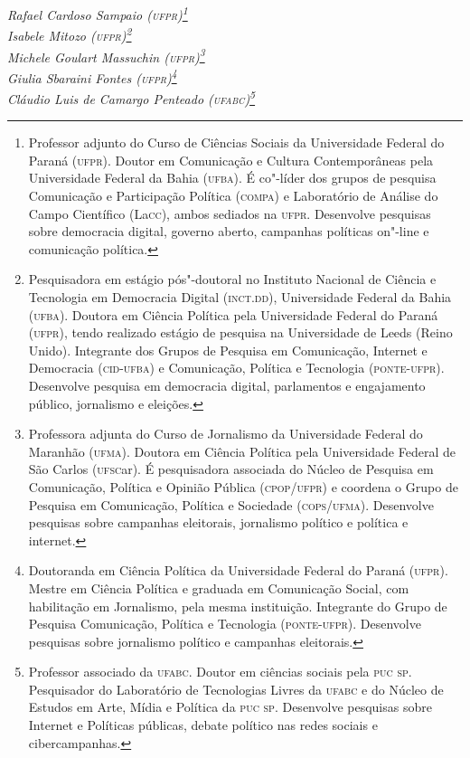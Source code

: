 \begin{flushright}
\emph{Rafael Cardoso Sampaio (\textsc{ufpr})\footnote{Professor adjunto do Curso de Ciências Sociais da Universidade Federal
do Paraná (\textsc{ufpr}). Doutor em Comunicação e Cultura Contemporâneas pela
Universidade Federal da Bahia (\textsc{ufba}). É co"-líder dos grupos de pesquisa
Comunicação e Participação Política (\textsc{compa}) e Laboratório de Análise do
Campo Científico (La\textsc{cc}), ambos sediados na \textsc{ufpr}. Desenvolve pesquisas
sobre democracia digital, governo aberto, campanhas políticas on"-line e
comunicação política.}\\Isabele Mitozo (\textsc{ufpr})\footnote{Pesquisadora em estágio pós"-doutoral no Instituto Nacional de Ciência e
Tecnologia em Democracia Digital (\textsc{inct}.\textsc{dd}), Universidade Federal da
Bahia (\textsc{ufba}). Doutora em Ciência Política pela Universidade Federal do
Paraná (\textsc{ufpr}), tendo realizado estágio de pesquisa na Universidade de
Leeds (Reino Unido). Integrante dos Grupos de Pesquisa em Comunicação,
Internet e Democracia (\textsc{cid}-\textsc{ufba}) e Comunicação, Política e Tecnologia
(\textsc{ponte}-\textsc{ufpr}). Desenvolve pesquisa em democracia digital, parlamentos e
engajamento público, jornalismo e eleições.}\\Michele Goulart
Massuchin (\textsc{ufpr})\footnote{Professora adjunta do Curso de Jornalismo da Universidade Federal do
Maranhão (\textsc{ufma}). Doutora em Ciência Política pela Universidade Federal
de São Carlos (\textsc{ufsc}ar). É pesquisadora associada do Núcleo de Pesquisa
em Comunicação, Política e Opinião Pública (\textsc{cpop}/\textsc{ufpr}) e coordena o
Grupo de Pesquisa em Comunicação, Política e Sociedade (\textsc{cops}/\textsc{ufma}).
Desenvolve pesquisas sobre campanhas eleitorais, jornalismo político e
política e internet.}\\Giulia Sbaraini Fontes (\textsc{ufpr})\footnote{Doutoranda em Ciência Política da Universidade Federal do Paraná (\textsc{ufpr}).
Mestre em Ciência Política e graduada em Comunicação Social, com
habilitação em Jornalismo, pela mesma instituição. Integrante do Grupo
de Pesquisa Comunicação, Política e Tecnologia (\textsc{ponte}-\textsc{ufpr}). Desenvolve
pesquisas sobre jornalismo político e campanhas eleitorais.}\\Cláudio Luis de Camargo Penteado (\textsc{ufabc})\footnote{Professor associado da \textsc{ufabc}. Doutor em ciências sociais pela \textsc{puc} \textsc{sp}.
Pesquisador do Laboratório de Tecnologias Livres da \textsc{ufabc} e do Núcleo de
Estudos em Arte, Mídia e Política da \textsc{puc} \textsc{sp}. Desenvolve pesquisas sobre
Internet e Políticas públicas, debate político nas redes sociais e
cibercampanhas.}}
\end{flushright}

